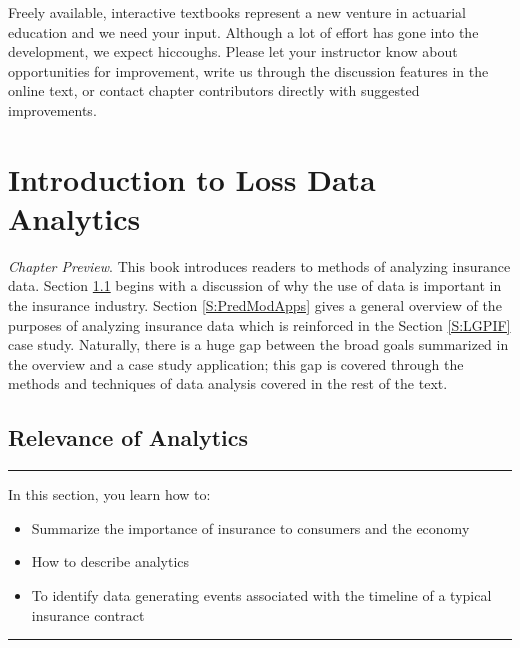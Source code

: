 \documentclass[]{book}
\providecommand{\tightlist}{%
  \setlength{\itemsep}{0pt}\setlength{\parskip}{0pt}}
\theoremstyle{definition}
\theoremstyle{definition}
\theoremstyle{definition}
\theoremstyle{remark}
\begin{document}
Freely available, interactive textbooks represent a new venture in
actuarial education and we need your input. Although a lot of effort has
gone into the development, we expect hiccoughs. Please let your
instructor know about opportunities for improvement, write us through
the discussion features in the online text, or contact chapter
contributors directly with suggested improvements.

\chapter{Introduction to Loss Data Analytics}\label{C:Intro}

\emph{Chapter Preview}. This book introduces readers to methods of
analyzing insurance data. Section \ref{S:Intro} begins with a discussion
of why the use of data is important in the insurance industry. Section
\ref{S:PredModApps} gives a general overview of the purposes of
analyzing insurance data which is reinforced in the Section
\ref{S:LGPIF} case study. Naturally, there is a huge gap between the
broad goals summarized in the overview and a case study application;
this gap is covered through the methods and techniques of data analysis
covered in the rest of the text.

\section{Relevance of Analytics}\label{S:Intro}

\begin{center}\rule{0.5\linewidth}{\linethickness}\end{center}

In this section, you learn how to:

\begin{itemize}
\tightlist
\item
  Summarize the importance of insurance to consumers and the economy
\item
  How to describe analytics
\item
  To identify data generating events associated with the timeline of a
  typical insurance contract
\end{itemize}

\begin{center}\rule{0.5\linewidth}{\linethickness}\end{center}
\end{document}
